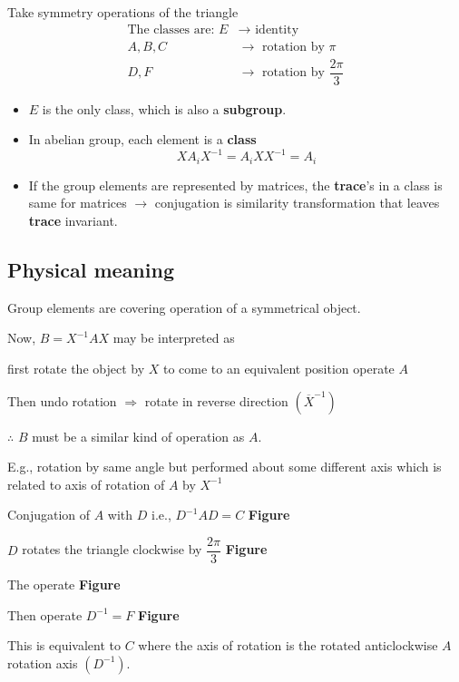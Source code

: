 \begin{example*}
Take symmetry operations of the triangle
\begin{align*}
\text{The classes are: } E &\to \text{ identity}\\
A,B,C &\to \text{ rotation by }\pi\\
D,F &\to \text{ rotation by } \dfrac{2\pi}{3}
\end{align*}
\begin{itemize}
\item $E$ is the only class, which is also a {\bf subgroup}.

\item In abelian group, each element is  a {\bf class}
$$
XA_{i}X^{-1}=A_{i}XX^{-1}=A_{i}
$$

\item If the group elements are represented by matrices, the {\bf trace}'s in a class is same for matrices $\to$ conjugation is similarity transformation that leaves {\bf trace} invariant.
\end{itemize}
\end{example*}

\subsection*{Physical meaning}

Group elements are covering operation of a symmetrical object.

Now, $B=X^{-1}AX$ may be interpreted as 

first rotate the object by $X$ to come to an equivalent position operate $A$

Then undo rotation $\Rightarrow$ rotate in reverse direction $(\overline{X}^{-1})$

$\therefore$ $B$ must be a similar kind of operation as $A$.

E.g., rotation by same angle but performed about some different axis which is related to axis of rotation of $A$ by $X^{-1}$

\begin{example*}
Conjugation of $A$ with $D$ i.e., $D^{-1}AD=C$ {\bf Figure}
 
$D$ rotates the triangle clockwise by $\dfrac{2\pi}{3}$ {\bf Figure}

The operate {\bf Figure}

Then operate $D^{-1}=F$ {\bf Figure}

This is equivalent to $C$ where the axis of rotation is the rotated anticlockwise $A$ rotation axis $(D^{-1})$.
\end{example*}

